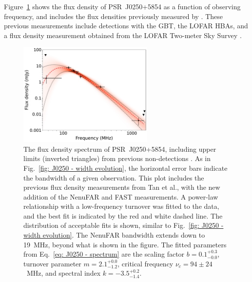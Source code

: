 Figure~\ref{fig: J0250 - spectrum} shows the flux density of PSR~J0250+5854 as a function of observing frequency, and includes the flux densities previously measured by \citet{TBC+2018}. These previous measurements include detections with the GBT, the LOFAR HBAs, and a flux density measurement obtained from the LOFAR Two-meter Sky Survey \citep[LoTSS;][]{SRB+2017}.
\begin{figure}
    \begin{center}
        \includegraphics[width=0.6\textwidth]{Figures/J0250/spectral_index_turnover.pdf}
        \caption[The radio frequency flux density spectrum of PSR~J0250+5854]{The flux density spectrum of PSR~J0250+5854, including upper limits (inverted triangles) from previous non-detections \citep{TBC+2018}. As in Fig.~\ref{fig: J0250 - width evolution}, the horizontal error bars indicate the bandwidth of a given observation. This plot includes the previous flux density measurements from Tan et al., with the new addition of the NenuFAR and FAST measurements. A power-law relationship with a low-frequency turnover was fitted to the data, and the best fit is indicated by the red and white dashed line. The distribution of acceptable fits is shown, similar to Fig.~\ref{fig: J0250 - width evolution}. The NenuFAR bandwidth extends down to 19~MHz, beyond what is shown in the figure. The fitted parameters from Eq.~\eqref{eq: J0250 - spectrum} are the scaling factor $b = 0.1^{+0.3}_{-0.0}$, turnover parameter $m = 2.1^{+0.0}_{-1.2}$, critical frequency $\nu_c = 94\pm24$~MHz, and spectral index $k = -3.5^{+0.2}_{-1.4}$.}
        \label{fig: J0250 - spectrum}
    \end{center}
\end{figure}
